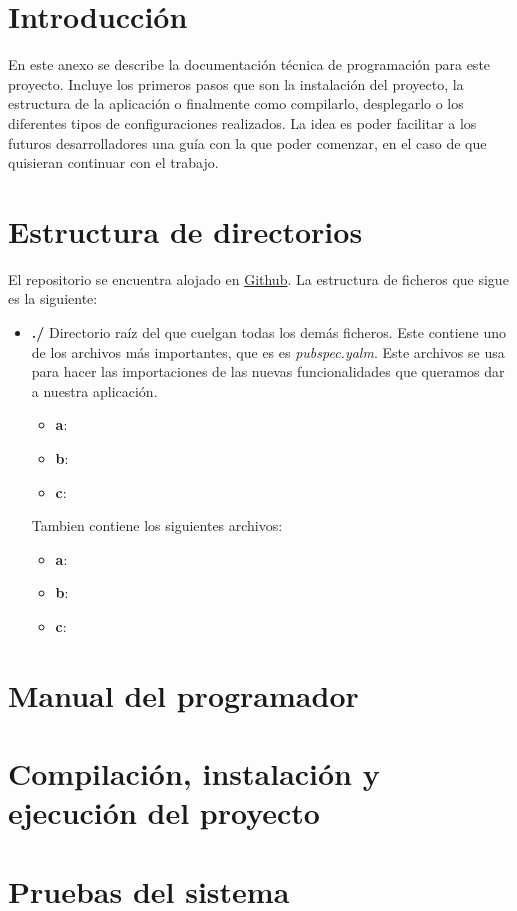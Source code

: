 
\section{Introducción}
En este anexo se describe la documentación técnica de programación para este proyecto. Incluye los primeros pasos que son la instalación del proyecto, la estructura de la aplicación o finalmente como compilarlo, desplegarlo o los diferentes tipos de configuraciones realizados. La idea es poder facilitar a los futuros desarrolladores una guía con la que poder comenzar, en el caso de que quisieran continuar con el trabajo.

\section{Estructura de directorios}
El repositorio se encuentra alojado en \href{https://github.com/scc0034/flutter_serpiente}{Github}. La estructura de ficheros que sigue es la siguiente:

\begin{itemize}
\item \textbf{./}
Directorio raíz del que cuelgan todas los demás ficheros. Este contiene uno de los archivos más importantes, que es es \emph{pubspec.yalm}. Este archivos se usa para hacer las importaciones de las nuevas funcionalidades que queramos dar a nuestra aplicación.

\begin{itemize}
	\item \textbf{a}: 
	\item \textbf{b}: 
	\item \textbf{c}: 
\end{itemize}

Tambien contiene los siguientes archivos:
\begin{itemize}
	\item \textbf{a}: 
	\item \textbf{b}:
	\item \textbf{c}:
\end{itemize}


\end{itemize}

\section{Manual del programador}

\section{Compilación, instalación y ejecución del proyecto}

\section{Pruebas del sistema}
